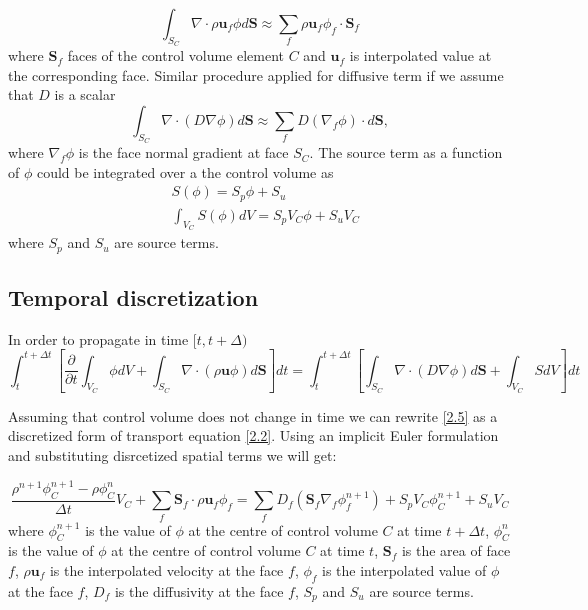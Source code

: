 \begin{equation}
    \int_{S_C}\nabla \cdot \rho\mathbf{u}_f \phi d \mathbf{S} \approx \sum_f  \rho\mathbf{u}_f \phi_f\cdot \mathbf{S}_f
\end{equation}
where $\mathbf{S}_f$ faces of the control volume element $C$ and $\mathbf{u}_{f}$ is interpolated value at the corresponding face.
Similar procedure applied for diffusive term if we assume that $D$ is a scalar
\begin{equation}
    \int_{S_C}\nabla\cdot(D \nabla \phi) d \mathbf{S} \approx \sum_f D (\nabla_f \phi)\cdot{d\mathbf{S}},
\end{equation}
where $ \nabla_f \phi$ is the face normal gradient at face $S_C$. The source term as a function of $\phi$ could be integrated over a the control volume as
\begin{equation}
\begin{array}{cc}
     &  S(\phi) = S_p\phi +S_u\\
     & \int_{V_C} S(\phi) d V  = S_p V_C\phi +S_u V_C
\end{array}
\end{equation}
where $S_p$ and $S_u$ are source terms.


\subsection{Temporal discretization}
In order to propagate in time $[t, t+\Delta)$
\begin{equation}\label{2.5}
\int^{t+\Delta t}_t \left[\frac{\partial}{\partial t}\int_{V_C} \phi d V+\int_{S_C} \nabla \cdot(\rho \mathbf{u}\phi) d \mathbf{S}\right] d t=\int^{t+\Delta t}_t\left[\int_{S_C} \nabla \cdot(D \nabla \phi) d \mathbf{S} + \int_{V_C} S d V\right] d t
\end{equation}

Assuming that control volume does not change in time we can rewrite \ref{2.5} as a discretized form of transport equation \ref{2.2}. Using an implicit Euler formulation and substituting disrcetized spatial terms we will get:

\begin{equation} \label{NS_discr}
\frac{\rho^{n+1}\phi^{n+1}_C - \rho\phi^{n}_C}{\Delta t} V_{C}+\sum_{f} \mathbf{S}_{f} \cdot \rho\mathbf{u}_{f}\phi_f =\sum_{f} D_f\left(\mathbf{S}_{f} \nabla_{f} \phi_f^{n+1}\right)+ S_p V_C\phi^{n+1}_C +S_u V_C
\end{equation}
where $\phi^{n+1}_C$ is the value of $\phi$ at the centre of control volume $C$ at time $t+\Delta t$, $\phi^{n}_C$ is the value of $\phi$ at the centre of control volume $C$ at time $t$, $\mathbf{S}_{f}$ is the area of face $f$, $\rho\mathbf{u}_{f}$ is the interpolated velocity at the face $f$, $\phi_f$ is the interpolated value of $\phi$ at the face $f$, $D_f$ is the diffusivity at the face $f$, $S_p$ and $S_u$ are source terms.

